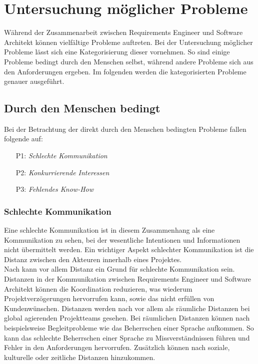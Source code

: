\section{Untersuchung m\"oglicher Probleme}\label{problem}
W\"ahrend der Zusammenarbeit zwischen Requirements Engineer und Software Architekt k\"onnen vielf\"altige Probleme auftreten. Bei der Untersuchung m\"oglicher Probleme l\"asst sich eine Kategorisierung dieser vornehmen. So sind einige Probleme bedingt durch den Menschen selbst, w\"ahrend andere Probleme sich aus den Anforderungen ergeben. Im folgenden werden die kategorisierten Probleme genauer ausgef\"uhrt. \\

\subsection{Durch den Menschen bedingt}
Bei der Betrachtung der direkt durch den Menschen bedingten Probleme fallen folgende auf:\\

\begin{itemize}
\item[P1:] \textit{Schlechte Kommunikation} 
\item[P2:] \textit{Konkurrierende Interessen}
\item[P3:] \textit{Fehlendes Know-How} \\
\end{itemize}

\subsubsection{Schlechte Kommunikation}
Eine schlechte Kommunikation ist in diesem Zusammenhang als eine Kommunikation zu sehen, bei der wesentliche Intentionen und Informationen nicht \"ubermittelt werden. Ein wichtiger Aspekt schlechter Kommunikation ist die Distanz zwischen den Akteuren innerhalb eines Projektes.\\

Nach \cite{Bja01} kann vor allem Distanz ein Grund f\"ur schlechte Kommunikation sein. Distanzen in der Kommunikation zwischen Requirements Engineer und Software Architekt k\"onnen die Koordination reduzieren, was wiederum Projektverz\"ogerungen hervorrufen kann, sowie das nicht erf\"ullen von Kundenw\"unschen. Distanzen werden nach \cite{Bja01} vor allem als r\"aumliche Distanzen bei global agierenden Projektteams gesehen. Bei r\"aumlichen Distanzen k\"onnen nach \cite{Her01} beispielsweise Begleitprobleme wie das Beherrschen einer Sprache aufkommen. So kann das schlechte Beherrschen einer Sprache zu Missverst\"andnissen f\"uhren und Fehler in den Anforderungen hervorrufen.  Zus\"atzlich k\"onnen nach \cite{Bja01} soziale, kulturelle oder zeitliche Distanzen hinzukommen.\\

